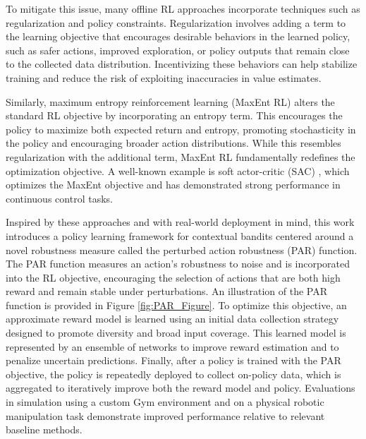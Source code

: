 \documentclass[./dissertation.tex]{subfiles}
\begin{document}
To mitigate this issue, many offline RL approaches incorporate techniques such as regularization and policy constraints. Regularization involves adding a term to the learning objective that encourages desirable behaviors in the learned policy, such as safer actions, improved exploration, or policy outputs that remain close to the collected data distribution. Incentivizing these behaviors can help stabilize training and reduce the risk of exploiting inaccuracies in value estimates. 

Similarly, maximum entropy reinforcement learning (MaxEnt RL) \parencite{MaxEntRL} alters the standard RL objective by incorporating an entropy term. This encourages the policy to maximize both expected return and entropy, promoting stochasticity in the policy and encouraging broader action distributions. While this resembles regularization with the additional term, MaxEnt RL fundamentally redefines the optimization objective. A well-known example is soft actor-critic (SAC) \parencite{SAC}, which optimizes the MaxEnt objective and has demonstrated strong performance in continuous control tasks. 

Inspired by these approaches and with real-world deployment in mind, this work introduces a policy learning framework for contextual bandits centered around a novel robustness measure called the perturbed action robustness (PAR) function. The PAR function measures an action's robustness to noise and is incorporated into the RL objective, encouraging the selection of actions that are both high reward and remain stable under perturbations. An illustration of the PAR function is provided in Figure \ref{fig:PAR_Figure}. To optimize this objective, an approximate reward model is learned using an initial data collection strategy designed to promote diversity and broad input coverage. This learned model is represented by an ensemble of networks to improve reward estimation and to penalize uncertain predictions. Finally, after a policy is trained with the PAR objective, the policy is repeatedly deployed to collect on-policy data, which is aggregated to iteratively improve both the reward model and policy. Evaluations in simulation using a custom Gym environment and on a physical robotic manipulation task demonstrate improved performance relative to relevant baseline methods.
\end{document}
